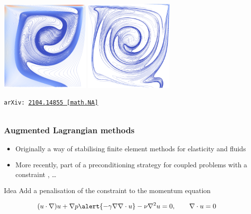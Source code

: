 \documentclass[presentation,aspectratio=43, 10pt]{beamer}
\newcommand{\arxivlink}[2]{{\texttt{arXiv:\,\href{https://arxiv.org/abs/#1}{#1\,[#2]}}}}
\begin{document}
\begin{frame}
\begin{columns}
\begin{column}{0.45\textwidth}
      \includegraphics[width=0.333\textwidth]{mhd/ldc_500_500_B}%
      \includegraphics[width=0.333\textwidth]{mhd/ldc_5000_5000_B}%

      \vspace{2em}
      {\raggedleft\scriptsize
        \textcite{Laakmann:2021} \arxivlink{2104.14855}{math.NA}\par}
    \end{column}
  \end{columns}
\end{frame}

\begin{frame}
  \frametitle{Augmented Lagrangian methods}
  \begin{itemize}
  \item Originally a way of stabilising finite element methods for
    elasticity and fluids \parencite{Fortin:1983}
  \item More recently, part of a preconditioning strategy for coupled
    problems with a constraint
    \parencite{Benzi:2006,Farrell:2019,Farrell:2021a,Shih:2021}, \dots
  \end{itemize}
  \begin{block}{Idea}
    Add a penalisation of the constraint to the momentum equation

    \begin{equation*}
      (u \cdot \nabla) u + \nabla p \alert{- \gamma \nabla \nabla
        \cdot u} - \nu \nabla^2 u = 0, \quad\quad \nabla \cdot u = 0
    \end{equation*}
  \end{block}
\end{frame}
\end{document}
